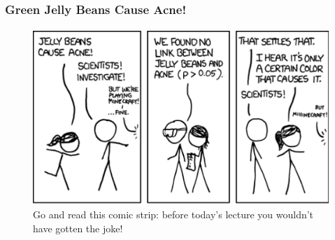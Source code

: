 \documentclass[handout]{beamer}
\begin{document}
\begin{frame}
\frametitle{Green Jelly Beans Cause Acne!}
\framesubtitle{\href{http://xkcd.com/882/}{}}
\begin{figure}
\centering
	\includegraphics[scale=0.45]{./images/xkcd1}
	\caption{Go and read this comic strip: before today's lecture you wouldn't have gotten the joke!}
\end{figure}
\end{frame}




\end{document}
